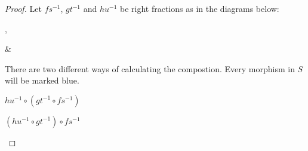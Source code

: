 \documentclass[11pt]{article}
\theoremstyle{definition}
\theoremstyle{remark}
\begin{document}
            \begin{proof}
                Let $fs^{-1}$, $gt^{-1}$ and $hu^{-1}$ be right fractions as in the diagrams below:
                \begin{center}
                    ,
                    \&
                \end{center}
                There are two different ways of calculating the compostion. Every morphism in $S$ will be marked blue.
                \begin{center}
                    \begin{minipage}[c]{0.4\textwidth}
                        \underline{$hu^{-1}\circ (gt^{-1}\circ fs^{-1})$}\\
                    \end{minipage}
                    \begin{minipage}[c]{0.4\textwidth}
                        \underline{$(hu^{-1}\circ gt^{-1})\circ fs^{-1}$}\\
\end{minipage}
\end{center}
\end{proof}
\end{document}
